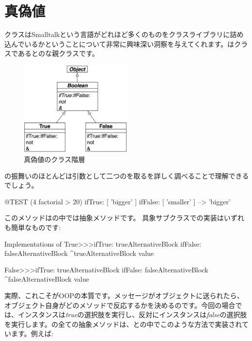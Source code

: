 \documentclass[a4paper,10pt,twoside]{book}
\begin{document}
\section{真偽値}

クラスはSmalltalkという言語がどれほど多くのものをクラスライブラリに詰め込んでいるかということについて非常に興味深い洞察を与えてくれます。はクラスであるとのな親クラスです。

\begin{figure}[ht]
  {\centerline {\includegraphics[width=0.5\textwidth]{BooleanHierarchy}}}
\caption{真偽値のクラス階層 }
\end{figure}

の振舞いのほとんどは引数として二つのを取るを詳しく調べることで理解できるでしょう。

\begin{code}{@TEST}
(4 factorial > 20) ifTrue: [ 'bigger' ] ifFalse: [ 'smaller' ] --> 'bigger'
\end{code}

このメソッドはの中では抽象メソッドです。
具象サブクラスでの実装はいずれも簡単なものです:

\begin{method}{Implementations of }
True>>>ifTrue: trueAlternativeBlock ifFalse: falseAlternativeBlock 
    ^trueAlternativeBlock value

False>>>ifTrue: trueAlternativeBlock ifFalse: falseAlternativeBlock 
    ^falseAlternativeBlock value
\end{method}

実際、これこそがOOPの本質です。メッセージがオブジェクトに送られたら、オブジェクト自身がどのメソッドで反応するかを決めるのです。今回の場合では、インスタンスは\emph{true}の選択肢を実行し、反対にインスタンスは\emph{false}の選択肢を実行します。の全ての抽象メソッドは、との中でこのような方法で実装されています。例えば:
\end{document}
